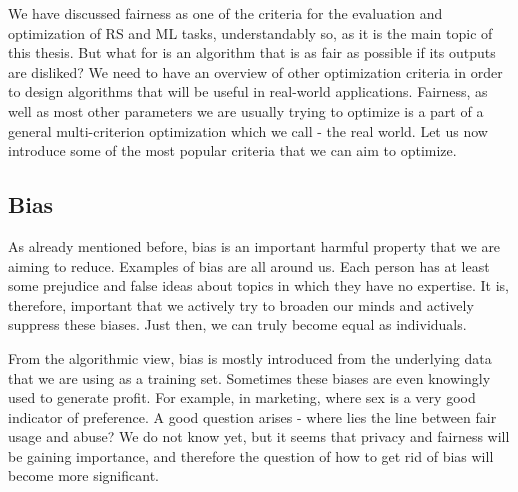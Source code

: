 
We have discussed fairness as one of the criteria for the evaluation and optimization of RS and ML tasks, understandably so, as it is the main topic of this thesis. But what for is an algorithm that is as fair as possible if its outputs are disliked? We need to have an overview of other optimization criteria in order to design algorithms that will be useful in real-world applications. Fairness, as well as most other parameters we are usually trying to optimize is a part of a general multi-criterion optimization which we call - the real world. Let us now introduce some of the most popular criteria that we can aim to optimize.

\subsection*{Bias}
As already mentioned before, bias is an important harmful property that we are aiming to reduce. Examples of bias are all around us. Each person has at least some prejudice and false ideas about topics in which they have no expertise. It is, therefore, important that we actively try to broaden our minds and actively suppress these biases. Just then, we can truly become equal as individuals.

From the algorithmic view, bias is mostly introduced from the underlying data that we are using as a training set. Sometimes these biases are even knowingly used to generate profit. For example, in marketing, where sex is a very good indicator of preference. A good question arises - where lies the line between fair usage and abuse? We do not know yet, but it seems that privacy and fairness will be gaining importance, and therefore the question of how to get rid of bias will become more significant.


